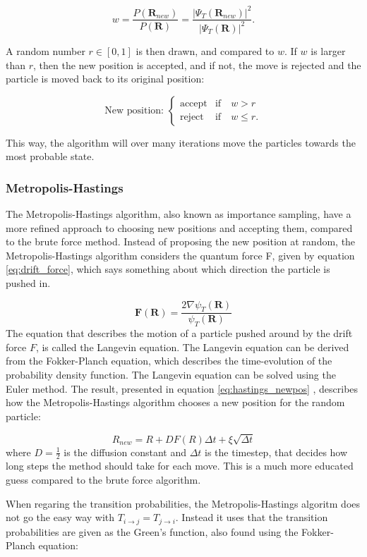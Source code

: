 \documentclass[norsk,a4paper,12pt]{article}
\begin{document}
\begin{equation}
w=\frac{P(\boldsymbol{R}_{new})}{P(\boldsymbol{R})}=\frac{|\Psi_T(\boldsymbol{R}_{new})|^2}{|\Psi_T(\boldsymbol{R})|^2}.
\end{equation}

A random number $r \in [0,1]$ is then drawn, and compared to $w$. If $w$ is larger than $r$, then the new position is accepted, and if not, the move is rejected and the particle is moved back to its original position:

\begin{equation}
\text{New position: }
\begin{cases} 
\text{accept} & \text{if}\quad w > r \\
\text{reject} & \text{if}\quad w \leq r.
\end{cases}
\end{equation}

This way, the algorithm will over many iterations move the particles towards the most probable state.


\subsubsection{Metropolis-Hastings}
The Metropolis-Hastings algorithm, also known as importance sampling, have a more refined approach to choosing new positions and accepting them, compared to the brute force method. Instead of proposing the new position at random, the Metropolis-Hastings algorithm considers the quantum force F, given by equation \ref{eq:drift_force}, which says something about which direction the particle is pushed in. 

\begin{equation}
\label{eq:drift_force}
\boldsymbol{F}(\boldsymbol{R}) = \frac{2 \nabla \psi_T(\boldsymbol{R})}{\psi_T(\boldsymbol{R})}
\end{equation}
The equation that describes the motion of a particle pushed around by the drift force $F$, is called the Langevin equation. The Langevin equation can be derived from the Fokker-Planch equation, which describes the time-evolution of the probability density function. The Langevin equation can be solved using the Euler method. The result, presented in equation \ref{eq:hastings_newpos} , describes how the Metropolis-Hastings algorithm chooses a new position for the random particle:

\begin{equation}
\label{eq:hastings_newpos}
R_{new} = R + DF(R)\Delta t + \xi\sqrt{\Delta t}
\end{equation}
where $D=\frac{1}{2}$ is the diffusion constant and $\Delta t$ is the timestep, that decides how long steps the method should take for each move. This is a much more educated guess compared to the brute force algorithm. 
\par 
\vspace{3mm}
When regaring the transition probabilities, the Metropolis-Hastings algoritm does not go the easy way with $T_{i\rightarrow j} = T_{j\rightarrow i}$.  Instead it uses that the transition probabilities are given as the Green's function, also found using the Fokker-Planch equation:
\end{document}
